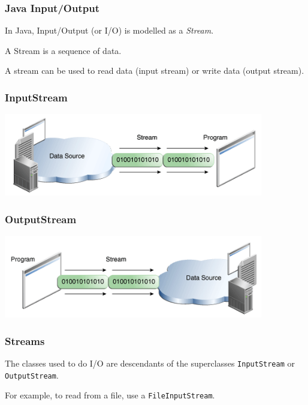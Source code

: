 \begin{frame}
\frametitle{Java Input/Output}
\begin{changemargin}{1cm}

In Java, Input/Output (or I/O) is modelled as a \textit{Stream}.

A Stream is a sequence of data. 

A stream can be used to read data (input stream) or write data (output stream). 


\end{changemargin}
\end{frame}

\begin{frame}
\frametitle{InputStream}
\begin{changemargin}{1cm}

\begin{center}
\includegraphics[width=0.85\textwidth]{images/inputstream.png}
\end{center}

\end{changemargin}
\end{frame}

\begin{frame}
\frametitle{OutputStream}
\begin{changemargin}{1cm}

\begin{center}
\includegraphics[width=0.85\textwidth]{images/outputstream.png}
\end{center}

\end{changemargin}
\end{frame}

\begin{frame}
\frametitle{Streams}
\begin{changemargin}{1cm}

The classes used to do I/O are descendants of the superclasses \texttt{InputStream} or \texttt{OutputStream}. 

For example, to read from a file, use a \texttt{FileInputStream}. 

\end{changemargin}
\end{frame}

